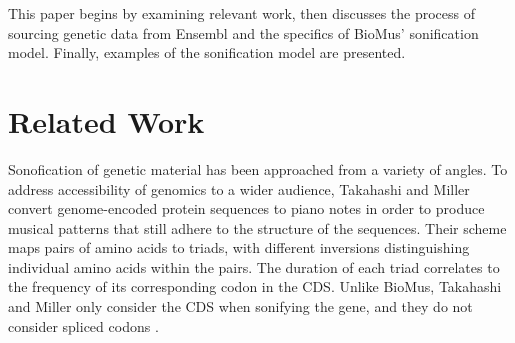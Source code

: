 \documentclass[letterpaper]{article}
\begin{document}





This paper begins by examining relevant work, then discusses the process of sourcing genetic data from Ensembl and the specifics of BioMus’ sonification model. Finally, examples of the sonification model are presented.

\section{Related Work}

Sonofication of genetic material has been approached from a variety of angles. To address accessibility of genomics to a wider audience, Takahashi and Miller convert genome-encoded protein sequences to piano notes in order to produce musical patterns that still adhere to the structure of the sequences. Their scheme maps pairs of amino acids to triads, with different inversions distinguishing individual amino acids within the pairs. The duration of each triad correlates to the frequency of its corresponding codon in the CDS. Unlike BioMus, Takahashi and Miller only consider the CDS when sonifying the gene, and they do not consider spliced codons \cite{takahashi_miller_2007}. 
\end{document}
